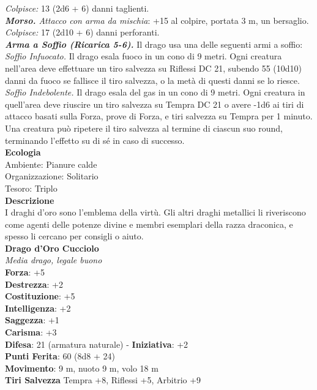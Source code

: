 \begin{multicols}{2}
\emph{Colpisce:} 13 (2d6 + 6) danni taglienti.\\
\emph{\textbf{Morso.} Attacco con arma da mischia}: +15 al colpire, portata 3 m, un bersaglio.\\
\emph{Colpisce:} 17 (2d10 + 6) danni perforanti.\\
\emph{\textbf{Arma a Soffio (Ricarica 5-6).}} Il drago usa una delle seguenti armi a soffio:\\
\emph{Soffio Infuocato.} Il drago esala fuoco in un cono di 9 metri. Ogni creatura nell'area deve effettuare un tiro salvezza su Riflessi DC  21, subendo 55 (10d10) danni da fuoco se fallisce il tiro salvezza, o la metà di questi danni se lo riesce.\\
\emph{Soffio Indebolente.} Il drago esala del gas in un cono di 9 metri. Ogni creatura in quell'area deve riuscire un tiro salvezza su Tempra DC  21 o avere -1d6 ai tiri di attacco basati sulla Forza, prove di Forza, e tiri salvezza su Tempra per 1 minuto. Una creatura può ripetere il tiro salvezza al termine di ciascun suo round, terminando l'effetto su di sé in caso di successo.\\
\textbf{Ecologia}\\
Ambiente: Pianure calde\\
Organizzazione: Solitario\\
Tesoro: Triplo\\
\textbf{Descrizione}\\
I draghi d'oro sono l'emblema della virtù. Gli altri draghi metallici li riveriscono come agenti delle potenze divine e membri esemplari della razza draconica, e spesso li cercano per consigli o aiuto.\\
\medskip\textbf{Drago d'Oro Cucciolo}\\
\emph{Media drago, legale buono}\\
\textbf{Forza}: +5\\
\textbf{Destrezza}: +2\\
\textbf{Costituzione}: +5\\
\textbf{Intelligenza}: +2\\
\textbf{Saggezza}: +1\\
\textbf{Carisma}: +3\\
\textbf{Difesa}: 21 (armatura naturale) - \textbf{Iniziativa}: +2\\
\textbf{Punti Ferita}: 60 (8d8 + 24)\\
\textbf{Movimento}: 9 m, nuoto 9 m, volo 18 m\\
\textbf{Tiri Salvezza} Tempra +8, Riflessi +5, Arbitrio +9\\

\end{multicols}

